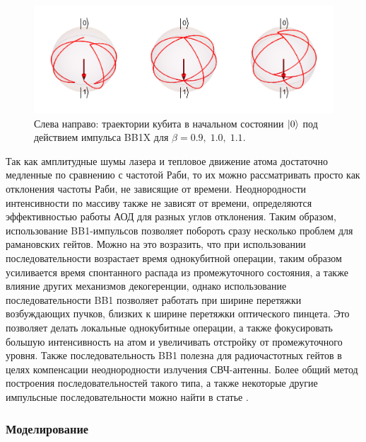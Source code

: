\begin{figure}[tb]
	\centering
	\includegraphics[width=1.0\textwidth]{images/BB1_Paths.pdf}
	\caption{Слева направо: траектории кубита в начальном состоянии $\left| 0 \right\rangle$ под действием импульса BB1X для $\beta=0.9, \; 1.0, \; 1.1.$}
	\label{fig:BB1}
\end{figure}

Так как амплитудные шумы лазера и тепловое движение атома достаточно медленные по сравнению с частотой Раби, то их можно рассматривать просто как отклонения частоты Раби, не зависящие от времени. Неоднородности интенсивности по массиву также не зависят от времени, определяются эффективностью работы АОД для разных углов отклонения. Таким образом, использование BB1-импульсов позволяет побороть сразу несколько проблем для рамановских гейтов. Можно на это возразить, что при использовании последовательности возрастает время однокубитной операции, таким образом усиливается время спонтанного распада из промежуточного состояния, а также влияние других механизмов декогеренции, однако использование последовательности BB1 позволяет работать при ширине перетяжки возбуждающих пучков, близких к ширине перетяжки оптического пинцета. Это позволяет делать локальные однокубитные операции, а также фокусировать большую интенсивность на атом и увеличивать отстройку от промежуточного уровня. Также последовательность BB1 полезна для радиочастотных гейтов в целях компенсации неоднородности излучения СВЧ-антенны. Более общий метод построения последовательностей такого типа, а также некоторые другие импульсные последовательности можно найти в статье \cite{PhysRevA.83.053420}.

\subsubsection{Моделирование}


